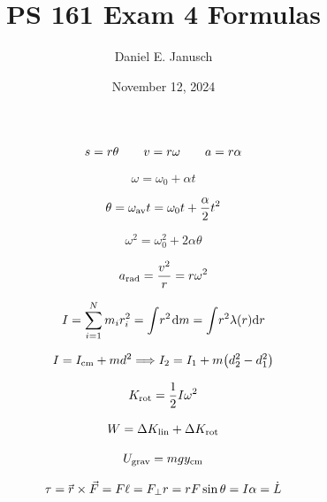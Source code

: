 \documentclass[12pt]{article}
\begin{document}

\title{PS 161 Exam 4 Formulas}
\author{Daniel E. Janusch}
\date{November 12, 2024}
\maketitle
\fi

\begin{equation}
	s = r \theta \hpx{20} v = r \omega \hpx{20} a = r \alpha
\end{equation}

\begin{equation}
	\omega = \omega_0 + \alpha t
\end{equation}

\begin{equation}
	\theta = \omega_{\textrm{av}} t = \omega_0 t + \dfrac \alpha 2 t^2
\end{equation}

\begin{equation}
	\omega^2 = \omega_0^2 + 2 \alpha \theta
\end{equation}

\begin{equation}
	a_{\textrm{rad}} = \dfrac{v^2}r = r \omega^2
\end{equation}

\begin{equation}
	I = \sum_{i=1}^N m_i r_i^2 = \int \! r^2 \hpx 1 \dm = \int \! r^2 \lambda(r) \dr
\end{equation}

\begin{equation}
	I = I_{\textrm{cm}} + m d^2 \Longrightarrow I_2 = I_1 + m \! \left( d_2^2 - d_1^2 \right)
\end{equation}

\begin{equation}
	K_{\textrm{rot}} = \dfrac 1 2 I \omega^2
\end{equation}

\begin{equation}
	W = \Delta K_{\textrm{lin}} + \Delta K_{\textrm{rot}}
\end{equation}

\begin{equation}
	U_{\textrm{grav}} = m g y_{\textrm{cm}}
\end{equation}

\begin{equation}
	\tau = \rvec \times \Fvec = F \ell = F_\perp r = r F \sin \theta = I \alpha = \dot L
\end{equation}
\end{document}
